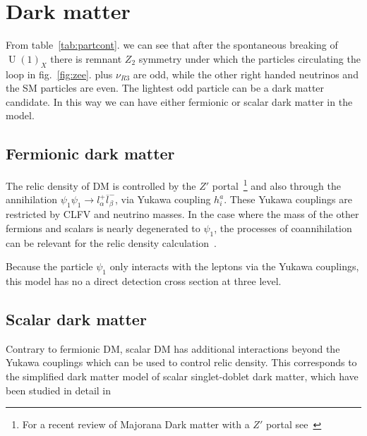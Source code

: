 \documentclass[12pt]{article}
\begin{document}
\section{Dark matter}
\label{sec:DM}
From table~\ref{tab:partcont}. we can see that after the spontaneous breaking of
$\operatorname{U}(1)_X$ there is remnant $Z_2$ symmetry under which the particles circulating the loop in fig.~\ref{fig:zee}. plus $\nu_{R3}$ are odd, while the other right handed neutrinos and the SM particles are even. The lightest odd particle can be a dark matter candidate. In this way we can have either fermionic or scalar dark matter in the model.

\subsection{Fermionic dark matter}
The relic density of DM is controlled by the $Z'$ portal~\footnote{For
  a recent review of Majorana Dark matter with a $Z'$ portal
  see~\cite{Blanco:2019hah} } and
also through the annihilation
$\psi_{1} \psi_{1} \to l _{\alpha}^+ \overline{l}_{\beta}^- $, via
Yukawa coupling $h^{a}_{i}$. These Yukawa couplings are restricted by
CLFV and neutrino masses. %
In the case where the mass of the other fermions and scalars is nearly
degenerated to $\psi_{1} $, the processes of coannihilation can be
relevant for the relic density calculation~\cite{Klasen:2013jpa}.

Because the particle $\psi_{1}$ only interacts with the leptons via the Yukawa couplings, this model has no a direct detection cross section at three level. 


\subsection{Scalar dark matter}
Contrary to fermionic DM, scalar DM has additional interactions beyond the Yukawa couplings  which can be used to control relic density. This corresponds to the simplified dark matter model of scalar singlet-doblet dark matter, which have been studied in detail in~\cite{} 
\end{document}
